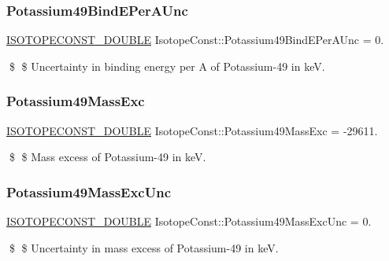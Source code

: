 \subsubsection{\texorpdfstring{Potassium49\+Bind\+E\+Per\+A\+Unc}{Potassium49BindEPerAUnc}}
{\footnotesize\ttfamily \mbox{\hyperlink{group___isotope_const-_macros_ga8f45a7272ce02c0b4c65c44636ed719a}{I\+S\+O\+T\+O\+P\+E\+C\+O\+N\+S\+T\+\_\+\+D\+O\+U\+B\+LE}} Isotope\+Const\+::\+Potassium49\+Bind\+E\+Per\+A\+Unc = 0.}

\$ \$ Uncertainty in binding energy per A of Potassium-\/49 in keV. \mbox{\label{group___isotope_const-_potassium-_k49_ga6190601a23748424117051e4f30b97bc}} 
\subsubsection{\texorpdfstring{Potassium49\+Mass\+Exc}{Potassium49MassExc}}
{\footnotesize\ttfamily \mbox{\hyperlink{group___isotope_const-_macros_ga8f45a7272ce02c0b4c65c44636ed719a}{I\+S\+O\+T\+O\+P\+E\+C\+O\+N\+S\+T\+\_\+\+D\+O\+U\+B\+LE}} Isotope\+Const\+::\+Potassium49\+Mass\+Exc = -\/29611.}

\$ \$ Mass excess of Potassium-\/49 in keV. \mbox{\label{group___isotope_const-_potassium-_k49_ga249cbb0e4e3b15445a944a6ccc1e40e2}} 
\subsubsection{\texorpdfstring{Potassium49\+Mass\+Exc\+Unc}{Potassium49MassExcUnc}}
{\footnotesize\ttfamily \mbox{\hyperlink{group___isotope_const-_macros_ga8f45a7272ce02c0b4c65c44636ed719a}{I\+S\+O\+T\+O\+P\+E\+C\+O\+N\+S\+T\+\_\+\+D\+O\+U\+B\+LE}} Isotope\+Const\+::\+Potassium49\+Mass\+Exc\+Unc = 0.}

\$ \$ Uncertainty in mass excess of Potassium-\/49 in keV. \mbox{\label{group___isotope_const-_potassium-_k49_ga892b5feb764d412e8d117c4fa4f42cda}} 
